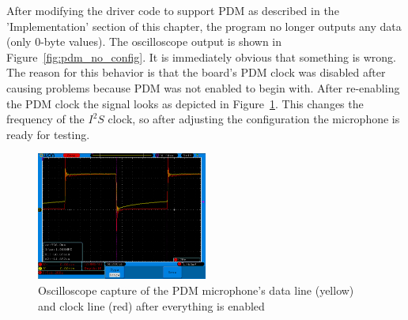 After modifying the driver code to support PDM as described in the 'Implementation' section of this chapter,
the program no longer outputs any data (only 0-byte values). The oscilloscope output is shown in Figure~\ref{fig:pdm_no_config}.
It is immediately obvious that something is wrong.
The reason for this behavior is that the board's PDM clock was disabled after causing problems because PDM was not enabled to begin with.
After re-enabling the PDM clock the signal looks as depicted in Figure~\ref{fig:pdm_working}.
This changes the frequency of the $I^2S$ clock, so after adjusting the configuration the microphone is ready for testing.

\begin{figure}[H]
    \begin{center}
        \includegraphics[width=0.5\textwidth]{figures/pdm_working.png}
    \end{center}
    \caption[Oscilloscope capture of the PDM microphone's data line (yellow) and clock line (red) after everything is enabled]
    {Oscilloscope capture of the PDM microphone's data line (yellow) and clock line (red) after everything is enabled}
    \label{fig:pdm_working}
\end{figure}

